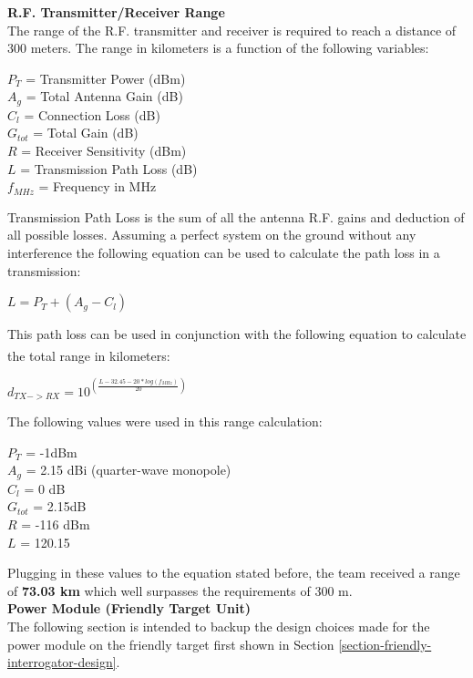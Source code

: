 \documentclass[letterpaper,10pt]{article}
\begin{document}
\begin{spacing}{1.15}
\normalsize\textbf{R.F. Transmitter/Receiver Range} \\
The range of the R.F. transmitter and receiver is required to reach a distance of 300 meters. The range in kilometers is a function of the following variables:
\begin{center}
$P_T$ = Transmitter Power (dBm) \\
$A_g$ = Total Antenna Gain (dB) \\
$C_l$ = Connection Loss (dB) \\ 
$G_{tot}$ = Total Gain (dB) \\
$R$ = Receiver Sensitivity (dBm) \\
$L$ = Transmission Path Loss (dB) \\
$f_{MHz}$ = Frequency in MHz \\
\end{center}

Transmission Path Loss is the sum of all the antenna R.F. gains and deduction of all possible losses. Assuming a perfect system on the ground without any interference the following equation can be used to calculate the path loss in a transmission:
\begin{center}
	$L = P_T + (A_g - C_l)$
\end{center}
This path loss can be used in conjunction with the following equation to calculate the total range in kilometers\textsuperscript{\cite{RFDistance}}:
\begin{center}
	\large
	$d_{TX->RX} = 10^{\left( \frac{L - 32.45 -20*log(f_{MHz})}{20}\right)}$
\end{center}
The following values were used in this range calculation:
\begin{center}
$P_T$ = -1dBm \\
$A_g$ = 2.15 dBi (quarter-wave monopole) \\
$C_l$ = 0 dB \\ 
$G_{tot}$ =  2.15dB\\
$R$ = -116 dBm \\
$L$ =  120.15\\
\end{center}
Plugging in these values to the equation stated before, the team received a range of \textbf{73.03 km} which well surpasses the requirements of 300 m. \\

\normalsize\textbf{Power Module (Friendly Target Unit)} \\
The following section is intended to backup the design choices made for the power module on the friendly target first shown in Section \ref{section-friendly-interrogator-design}.


\end{spacing}
\end{document}
